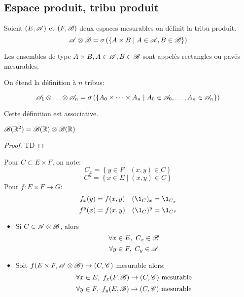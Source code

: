 \subsection{Espace produit, tribu produit}

\begin{definition}
	Soient $(E,\mathscr{A})$ et $(F,\mathscr{B})$ deux espaces mesurables on définit la tribu produit.
	$$\mathscr{A} \otimes \mathscr{B} = \sigma \left(\left\{ A \times B \mid A\in \mathscr{A}, B \in \mathscr{B} \right\}\right)$$
\end{definition}

\begin{remarque}
	Les ensembles de type $A\times B, A\in \mathscr{A}, B\in\mathscr{B}$ sont appelés rectangles ou pavés mesurables.
\end{remarque}


\begin{definition}
	On étend la définition à $n$ tribus:

	$$\triA_1 \xor \dots \xor \triA_n = \sigma \left(\left\{ A_0 \times \dots \times A_n \mid A_0\in \triA_0, \dots , A_n \in \triA_n \right\}\right)$$

	Cette définition est associative.
\end{definition}

\begin{prop}
	$\mathscr{B}(\mathbb{R}^2) = \mathscr{B}(\mathbb{R}) \otimes \mathscr{B}(\mathbb{R})$
\end{prop}

\begin{proof}
	TD %
\end{proof}

\begin{notation}
	Pour $C \subset E \times F$, on note:
	$$ C_x = \left\{ y \in F \mid (x,y) \in C \right\} $$
	$$ C^y = \left\{ x \in E \mid (x,y) \in C \right\} $$
	Pour $f: E \times F \to G$:
	$$f_x(y) = f(x,y) \quad (\1_C)_x = \1_{C_x}$$
	$$f^y(x) = f(x,y) \quad (\1_C)^y = \1_{C^y} $$
\end{notation}

\begin{prop}
	\begin{itemize}
		\item Si $C \in \mathscr{A} \otimes \mathscr{B}$, alors
		      $$\forall x \in E,\ C_x \in \mathscr{B}$$
		      $$\forall y \in F,\ C_y \in \mathscr{A}$$
		\item Soit $f (E\times F, \mathscr{A} \otimes \mathscr{B}) \to (C, \mathscr{C})$ mesurable alors:
		      $$\forall x \in E, \ f_x (F, \mathscr{B})  \to (C, \mathscr{C}) \text{ mesurable}$$
		      $$\forall y \in F, \ f_y (E, \mathscr{B})  \to (C, \mathscr{C}) \text{ mesurable}$$
	\end{itemize}
\end{prop}


